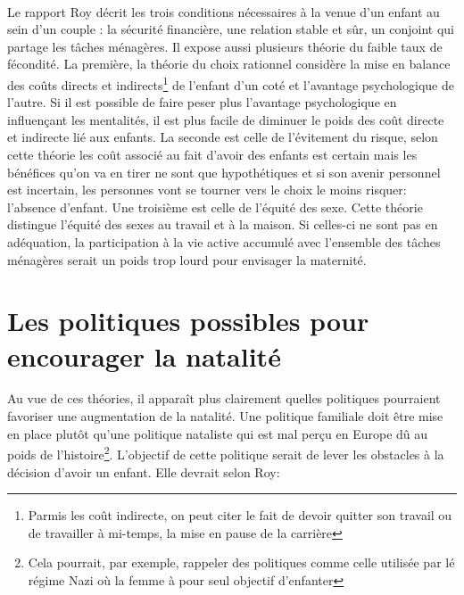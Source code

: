 \paragraph{}Le rapport Roy\citep{quebec} décrit les trois conditions nécessaires à la venue d’un enfant au sein d’un couple : la sécurité financière, une relation stable et sûr, un conjoint qui partage les tâches ménagères\citep[pp.19]{quebec}. Il expose aussi plusieurs théorie du faible taux de fécondité. La première, la théorie du choix rationnel considère la mise en balance des coûts directs et indirects\footnote{Parmis les coût indirecte, on peut citer le fait de devoir quitter son travail ou de travailler à mi-temps, la mise en pause de la carrière} de l’enfant d’un coté et l’avantage psychologique de l’autre. Si il est possible de faire peser plus l’avantage psychologique en influençant les mentalités, il est plus facile de diminuer le poids des coût directe et indirecte lié aux enfants\citep[pp.23]{quebec}. La seconde est celle de l’évitement du risque, selon cette théorie les coût associé au fait d’avoir des enfants est certain mais les bénéfices qu’on va en tirer ne sont que hypothétiques et si son avenir personnel est incertain, les personnes vont se tourner vers le choix le moins risquer: l’absence d’enfant\citep[pp.24]{quebec}. Une troisième est celle de l’équité des sexe\citep[pp.25]{quebec}. Cette théorie distingue l’équité des sexes au travail et à la maison. Si celles-ci ne sont pas en adéquation, la participation à la vie active accumulé avec l'ensemble des tâches ménagères serait un poids trop lourd pour envisager la maternité. 
\section{Les politiques possibles pour encourager la natalité}
Au vue de ces théories, il apparaît plus clairement quelles politiques pourraient favoriser une augmentation de la natalité. Une politique familiale doit être mise en place plutôt qu’une politique nataliste qui est mal perçu en Europe dû au poids de l’histoire\citep[pp.27]{quebec}\footnote{Cela pourrait, par exemple, rappeler des politiques comme celle utilisée par lé régime Nazi où la femme à pour seul objectif d'enfanter\citep{nazi}}. L’objectif de cette politique serait de lever les obstacles à la décision d’avoir un enfant. Elle devrait selon Roy\citep[pp.43-46]{quebec}:


